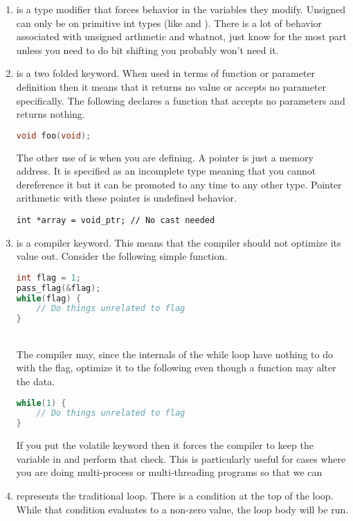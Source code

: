 \begin{enumerate}
	\item {} is a type modifier that forces  behavior in the variables they modify. Unsigned can only be on primitive int types (like  and ). There is a lot of behavior associated with unsigned arthmetic and whatnot, just know for the most part unless you need to do bit shifting you probably won't need it.

	\item {} is a two folded keyword. When used in terms of function or parameter definition then it means that it returns no value or accepts no parameter specifically. The following declares a function that accepts no parameters and returns nothing.

	      \begin{lstlisting}[language=C]
void foo(void);
\end{lstlisting}


	      The other use of  is when you are defining. A  pointer is just a memory address. It is specified as an incomplete type meaning that you cannot dereference it but it can be promoted to any time to any other type. Pointer arithmetic with these pointer is undefined behavior.

	      \begin{lstlisting}[langauge=C]
int *array = void_ptr; // No cast needed
\end{lstlisting}

	\item {} is a compiler keyword. This means that the compiler should not optimize its value out. Consider the following simple function.
	      \\
	      \begin{lstlisting}[language=C]
int flag = 1;
pass_flag(&flag);
while(flag) {
    // Do things unrelated to flag
}
\end{lstlisting}
	      \\
	      The compiler may, since the internals of the while loop have nothing to do with the flag, optimize it to the following even though a function may alter the data.
	      \\
	      \begin{lstlisting}[language=C]
while(1) {
    // Do things unrelated to flag
}
\end{lstlisting}
	      If you put the volatile keyword then it forces the compiler to keep the variable in and perform that check. This is particularly useful for cases where you are doing multi-process or multi-threading programs so that we can
	\item {} represents the traditional  loop. There is a condition at the top of the loop. While that condition evaluates to a non-zero value, the loop body will be run.
\end{enumerate}

